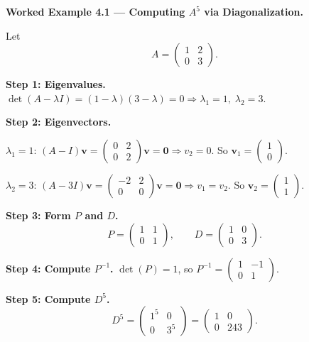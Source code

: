 \documentclass[12pt,a4paper]{article}
\begin{document}
\textbf{Worked Example 4.1 --- Computing $A^5$ via Diagonalization.}

Let
\[
  A = \begin{pmatrix} 1 & 2 \\ 0 & 3 \end{pmatrix}.
\]

\textbf{Step 1: Eigenvalues.}
$\det(A - \lambda I) = (1-\lambda)(3-\lambda) = 0 \Rightarrow \lambda_1 = 1,\; \lambda_2 = 3$.

\textbf{Step 2: Eigenvectors.}

$\lambda_1 = 1$: $(A-I)\mathbf{v} = \begin{pmatrix}0&2\\0&2\end{pmatrix}\mathbf{v} = \mathbf{0} \Rightarrow v_2 = 0$. So $\mathbf{v}_1 = \begin{pmatrix}1\\0\end{pmatrix}$.

$\lambda_2 = 3$: $(A-3I)\mathbf{v} = \begin{pmatrix}-2&2\\0&0\end{pmatrix}\mathbf{v} = \mathbf{0} \Rightarrow v_1 = v_2$. So $\mathbf{v}_2 = \begin{pmatrix}1\\1\end{pmatrix}$.

\textbf{Step 3: Form $P$ and $D$.}
\[
  P = \begin{pmatrix}1&1\\0&1\end{pmatrix}, \qquad D = \begin{pmatrix}1&0\\0&3\end{pmatrix}.
\]

\textbf{Step 4: Compute $P^{-1}$.}
$\det(P) = 1$, so $P^{-1} = \begin{pmatrix}1&-1\\0&1\end{pmatrix}$.

\textbf{Step 5: Compute $D^5$.}
\[
  D^5 = \begin{pmatrix}1^5&0\\0&3^5\end{pmatrix} = \begin{pmatrix}1&0\\0&243\end{pmatrix}.
\]
\end{document}
